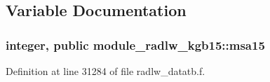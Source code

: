 \subsection{Variable Documentation}
\subsubsection[{\texorpdfstring{msa15}{msa15}}]{\setlength{\rightskip}{0pt plus 5cm}integer, public module\+\_\+radlw\+\_\+kgb15\+::msa15}\hypertarget{namespacemodule__radlw__kgb15_abb9e98034166a07a6e349631d7fbb2a3}{}\label{namespacemodule__radlw__kgb15_abb9e98034166a07a6e349631d7fbb2a3}


Definition at line 31284 of file radlw\+\_\+datatb.\+f.

